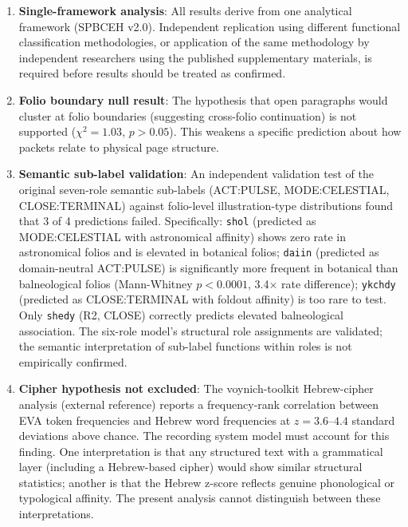 \documentclass[11pt,a4paper,twocolumn]{article}
\begin{document}
\begin{enumerate}[leftmargin=*,itemsep=2pt]
    \item \textbf{Single-framework analysis}: All results derive from one analytical framework (SPBCEH v2.0). Independent replication using different functional classification methodologies, or application of the same methodology by independent researchers using the published supplementary materials, is required before results should be treated as confirmed.

    \item \textbf{Folio boundary null result}: The hypothesis that open paragraphs would cluster at folio boundaries (suggesting cross-folio continuation) is not supported ($\chi^2 = 1.03$, $p > 0.05$). This weakens a specific prediction about how packets relate to physical page structure.

    \item \textbf{Semantic sub-label validation}: An independent validation test of the original seven-role semantic sub-labels (ACT:PULSE, MODE:CELESTIAL, CLOSE:TERMINAL) against folio-level illustration-type distributions found that 3 of 4 predictions failed. Specifically: \texttt{shol} (predicted as MODE:CELESTIAL with astronomical affinity) shows zero rate in astronomical folios and is elevated in botanical folios; \texttt{daiin} (predicted as domain-neutral ACT:PULSE) is significantly more frequent in botanical than balneological folios (Mann-Whitney $p < 0.0001$, 3.4$\times$ rate difference); \texttt{ykchdy} (predicted as CLOSE:TERMINAL with foldout affinity) is too rare to test. Only \texttt{shedy} (R2, CLOSE) correctly predicts elevated balneological association. The six-role model's structural role assignments are validated; the semantic interpretation of sub-label functions within roles is not empirically confirmed.

    \item \textbf{Cipher hypothesis not excluded}: The voynich-toolkit Hebrew-cipher analysis (external reference) reports a frequency-rank correlation between EVA token frequencies and Hebrew word frequencies at $z = 3.6$--$4.4$ standard deviations above chance. The recording system model must account for this finding. One interpretation is that any structured text with a grammatical layer (including a Hebrew-based cipher) would show similar structural statistics; another is that the Hebrew z-score reflects genuine phonological or typological affinity. The present analysis cannot distinguish between these interpretations.


\end{enumerate}
\end{document}

